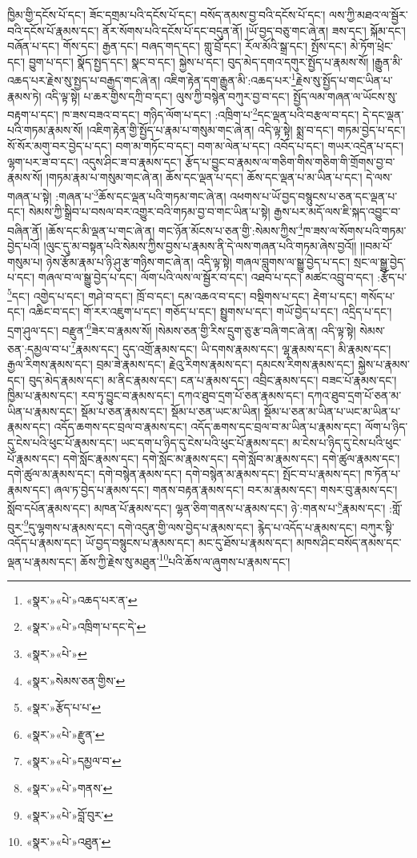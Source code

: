 ཁྱིམ་གྱི་དངོས་པོ་དང་། ཟོང་དགྲམ་པའི་དངོས་པོ་དང་། བསོད་ནམས་བྱ་བའི་དངོས་པོ་དང་། ལས་ཀྱི་མཐའ་ལ་སྦྱོར་བའི་དངོས་པོ་རྣམས་དང་། ནོར་སོགས་པའི་དངོས་པོ་དང་བདུན་ནོ། །ཡོ་བྱད་བཅུ་གང་ཞེ་ན། ཟས་དང་། སྐོམ་དང་། བཞོན་པ་དང་། གོས་དང་། རྒྱན་དང་། བཞད་གད་དང་། གླུ་བྲོ་དང་། རོལ་མོའི་སྒྲ་དང་། སྤོས་དང་། མེ་ཏོག་ཕྲེང་དང་། བྱུག་པ་དང་། སྣོད་སྤྱད་དང་། སྣང་བ་དང་། སྐྱེས་པ་དང་། བུད་མེད་དགའ་དགུར་སྤྱོད་པ་རྣམས་སོ། །རྒྱུན་མི་འཆད་པར་རྗེས་སུ་སྤྱད་པ་བརྒྱད་གང་ཞེ་ན། འཇིག་རྟེན་དག་རྒྱུན་མི་:འཆད་པར་\footnote{«སྣར་»«པེ་»འཆད་པར་ན་}རྗེས་སུ་སྤྱོད་པ་གང་ཡིན་པ་རྣམས་ཏེ། འདི་ལྟ་སྟེ། པ་ཆར་གྱིས་དཀྲི་བ་དང་། ལུས་ཀྱི་བསྙེན་བཀུར་བྱ་བ་དང་། སྤྱོད་ལམ་གཞན་ལ་ཡོངས་སུ་བརྟག་པ་དང་། ཁ་ཟས་བཟའ་བ་དང་། གཉིད་ལོག་པ་དང་། :འཁྲིག་པ་\footnote{«སྣར་»«པེ་»འཁྲིག་པ་དང་དེ་}དང་ལྡན་པའི་བརྩལ་བ་དང་། དེ་དང་ལྡན་པའི་གཏམ་རྣམས་སོ། །འཇིག་རྟེན་གྱི་སྤྱོད་པ་རྣམ་པ་གསུམ་གང་ཞེ་ན། འདི་ལྟ་སྟེ། སྨྲ་བ་དང་། གཏམ་བྱེད་པ་དང་། སོ་སོར་མགུ་བར་བྱེད་པ་དང་། བག་མ་གཏོང་བ་དང་། བག་མ་ལེན་པ་དང་། འབོད་པ་དང་། གཡར་འདྲེན་པ་དང་། ལྷག་པར་ཟ་བ་དང་། འདུས་ཤིང་ཟ་བ་རྣམས་དང་། རྩོད་པ་བྱུང་བ་རྣམས་ལ་གཅིག་གིས་གཅིག་གི་གྲོགས་བྱ་བ་རྣམས་སོ། །གཏམ་རྣམ་པ་གསུམ་གང་ཞེ་ན། ཆོས་དང་ལྡན་པ་དང་། ཆོས་དང་ལྡན་པ་མ་ཡིན་པ་དང་། དེ་ལས་གཞན་པ་སྟེ། :གཞན་པ་\footnote{«སྣར་»«པེ་»}ཆོས་དང་ལྡན་པའི་གཏམ་གང་ཞེ་ན། འཕགས་པ་ཡོ་བྱད་བསྙུངས་པ་ཅན་དང་ལྡན་པ་དང་། སེམས་ཀྱི་སྒྲིབ་པ་བསལ་བར་འགྱུར་བའི་གཏམ་བྱ་བ་གང་ཡིན་པ་སྟེ། རྒྱས་པར་མདོ་ལས་ཇི་སྐད་འབྱུང་བ་བཞིན་ནོ། །ཆོས་དང་མི་ལྡན་པ་གང་ཞེ་ན། གང་ཉོན་མོངས་པ་ཅན་གྱི་:སེམས་ཀྱིས་\footnote{«སྣར་»སེམས་ཅན་གྱིས་}ཁ་ཟས་ལ་སོགས་པའི་གཏམ་བྱེད་པའོ། །ལུང་དུ་མ་བསྟན་པའི་སེམས་ཀྱིས་བྱས་པ་རྣམས་ནི་དེ་ལས་གཞན་པའི་གཏམ་ཞེས་བྱའོ།། །།བམ་པོ་གསུམ་པ། ཉེས་རྩོམ་རྣམ་པ་ཉི་ཤུ་རྩ་གཉིས་གང་ཞེ་ན། འདི་ལྟ་སྟེ། གཞལ་བླུགས་ལ་སྒྱུ་བྱེད་པ་དང་། སྲང་ལ་སྒྱུ་བྱེད་པ་དང་། གཞལ་བ་ལ་སྒྱུ་བྱེད་པ་དང་། ལོག་པའི་ལས་ལ་སྦྱོར་བ་དང་། འཐབ་པ་དང་། མཚང་འབྲུ་བ་དང་། :རྩོད་པ་\footnote{«སྣར་»རྩོད་པ་པ་}དང་། འགྱེད་པ་དང་། གཤེ་བ་དང་། ཁྲོ་བ་དང་། དམ་འཆའ་བ་དང་། བསྡིགས་པ་དང་། རྡེག་པ་དང་། གསོད་པ་དང་། འཆིང་བ་དང་། གོ་རར་འཇུག་པ་དང་། གཅོད་པ་དང་། སྤྱུགས་པ་དང་། གཡོ་བྱེད་པ་དང་། འདྲིད་པ་དང་། དྲག་ཤུལ་དང་། བརྫུན་\footnote{«སྣར་»«པེ་»རྫུན་}ཟེར་བ་རྣམས་སོ། །སེམས་ཅན་གྱི་རིས་དྲུག་ཅུ་རྩ་བཞི་གང་ཞེ་ན། འདི་ལྟ་སྟེ། སེམས་ཅན་:དམྱལ་བ་པ་\footnote{«སྣར་»«པེ་»དམྱལ་བ་}རྣམས་དང་། དུད་འགྲོ་རྣམས་དང་། ཡི་དགས་རྣམས་དང་། ལྷ་རྣམས་དང་། མི་རྣམས་དང་། རྒྱལ་རིགས་རྣམས་དང་། བྲམ་ཟེ་རྣམས་དང་། རྗེའུ་རིགས་རྣམས་དང་། དམངས་རིགས་རྣམས་དང་། སྐྱེས་པ་རྣམས་དང་། བུད་མེད་རྣམས་དང་། མ་ནིང་རྣམས་དང་། ངན་པ་རྣམས་དང་། འབྲིང་རྣམས་དང་། བཟང་པོ་རྣམས་དང་། ཁྱིམ་པ་རྣམས་དང་། རབ་ཏུ་བྱུང་བ་རྣམས་དང་། དཀའ་ཐུབ་དྲག་པོ་ཅན་རྣམས་དང་། དཀའ་ཐུབ་དྲག་པོ་ཅན་མ་ཡིན་པ་རྣམས་དང་། སྡོམ་པ་ཅན་རྣམས་དང་། སྡོམ་པ་ཅན་ཡང་མ་ཡིན། སྡོམ་པ་ཅན་མ་ཡིན་པ་ཡང་མ་ཡིན་པ་རྣམས་དང་། འདོད་ཆགས་དང་བྲལ་བ་རྣམས་དང་། འདོད་ཆགས་དང་བྲལ་བ་མ་ཡིན་པ་རྣམས་དང་། ལོག་པ་ཉིད་དུ་ངེས་པའི་ཕུང་པོ་རྣམས་དང་། ཡང་དག་པ་ཉིད་དུ་ངེས་པའི་ཕུང་པོ་རྣམས་དང་། མ་ངེས་པ་ཉིད་དུ་ངེས་པའི་ཕུང་པོ་རྣམས་དང་། དགེ་སློང་རྣམས་དང་། དགེ་སློང་མ་རྣམས་དང་། དགེ་སློབ་མ་རྣམས་དང་། དགེ་ཚུལ་རྣམས་དང་། དགེ་ཚུལ་མ་རྣམས་དང་། དགེ་བསྙེན་རྣམས་དང་། དགེ་བསྙེན་མ་རྣམས་དང་། སྤོང་བ་པ་རྣམས་དང་། ཁ་ཏོན་པ་རྣམས་དང་། ཞལ་ཏ་བྱེད་པ་རྣམས་དང་། གནས་བརྟན་རྣམས་དང་། བར་མ་རྣམས་དང་། གསར་བུ་རྣམས་དང་། སློབ་དཔོན་རྣམས་དང་། མཁན་པོ་རྣམས་དང་། ལྷན་ཅིག་གནས་པ་རྣམས་དང་། ཉེ་:གནས་པ་\footnote{«སྣར་»«པེ་»གནས་}རྣམས་དང་། :གློ་བུར་\footnote{«སྣར་»«པེ་»བློ་བུར་}དུ་ལྷགས་པ་རྣམས་དང་། དགེ་འདུན་གྱི་ལས་བྱེད་པ་རྣམས་དང་། རྙེད་པ་འདོད་པ་རྣམས་དང་། བཀུར་སྟི་འདོད་པ་རྣམས་དང་། ཡོ་བྱད་བསྙུངས་པ་རྣམས་དང་། མང་དུ་ཐོས་པ་རྣམས་དང་། མཁས་ཤིང་བསོད་ནམས་དང་ལྡན་པ་རྣམས་དང་། ཆོས་ཀྱི་རྗེས་སུ་མཐུན་\footnote{«སྣར་»«པེ་»འཐུན་}པའི་ཆོས་ལ་ཞུགས་པ་རྣམས་དང་། 